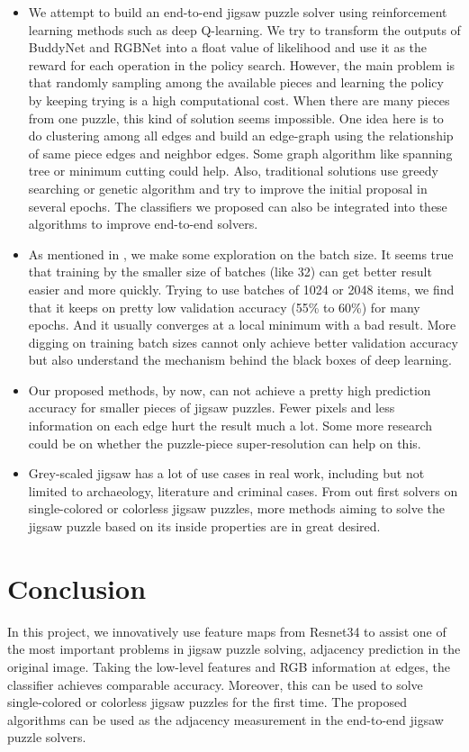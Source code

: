 \documentclass{article}
\begin{document}
\begin{itemize}
    \item We attempt to build an end-to-end jigsaw puzzle solver using reinforcement learning methods such as deep Q-learning. We try to transform the outputs of BuddyNet and RGBNet into a float value of likelihood and use it as the reward for each operation in the policy search. However, the main problem is that randomly sampling among the available pieces and learning the policy by keeping trying is a high computational cost. When there are many pieces from one puzzle, this kind of solution seems impossible. One idea here is to do clustering among all edges and build an edge-graph using the relationship of same piece edges and neighbor edges. Some graph algorithm like spanning tree or minimum cutting could help. Also, traditional solutions use greedy searching or genetic algorithm and try to improve the initial proposal in several epochs. The classifiers we proposed can also be integrated into these algorithms to improve end-to-end solvers.
    \item As mentioned in \cite{masters2018revisiting}, we make some exploration on the batch size. It seems true that training by the smaller size of batches (like 32) can get better result easier and more quickly. Trying to use batches of 1024 or 2048 items, we find that it keeps on pretty low validation accuracy (55\% to 60\%) for many epochs. And it usually converges at a local minimum with a bad result. More digging on training batch sizes cannot only achieve better validation accuracy but also understand the mechanism behind the black boxes of deep learning.
    \item Our proposed methods, by now, can not achieve a pretty high prediction accuracy for smaller pieces of jigsaw puzzles. Fewer pixels and less information on each edge hurt the result much a lot. Some more research could be on whether the puzzle-piece super-resolution can help on this.
    \item Grey-scaled jigsaw has a lot of use cases in real work, including but not limited to archaeology, literature and criminal cases. From out first solvers on single-colored or colorless jigsaw puzzles, more methods aiming to solve the jigsaw puzzle based on its inside properties are in great desired.
\end{itemize}

\section{Conclusion}

In this project, we innovatively use feature maps from Resnet34 to assist one of the most important problems in jigsaw puzzle solving, adjacency prediction in the original image. Taking the low-level features and RGB information at edges, the classifier achieves comparable accuracy. Moreover, this can be used to solve single-colored or colorless jigsaw puzzles for the first time. The proposed algorithms can be used as the adjacency measurement in the end-to-end jigsaw puzzle solvers.



\end{document}
